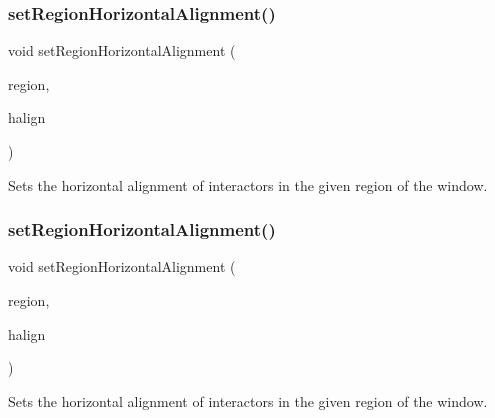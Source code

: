 \subsubsection{\texorpdfstring{set\+Region\+Horizontal\+Alignment()}{setRegionHorizontalAlignment()}\hspace{0.1cm}{\footnotesize\ttfamily [1/2]}}
{\footnotesize\ttfamily void set\+Region\+Horizontal\+Alignment (\begin{DoxyParamCaption}\item[{\mbox{\hyperlink{classGWindow_a81a01a86de31071a92e6cce0bab9bc4b}{Region}}}]{region,  }\item[{Horizontal\+Alignment}]{halign }\end{DoxyParamCaption})\hspace{0.3cm}{\ttfamily [virtual]}}



Sets the horizontal alignment of interactors in the given region of the window. 

\mbox{\label{classGWindow_aefb97090ff4e149f8a0cce9efee3c451}} 
\subsubsection{\texorpdfstring{set\+Region\+Horizontal\+Alignment()}{setRegionHorizontalAlignment()}\hspace{0.1cm}{\footnotesize\ttfamily [2/2]}}
{\footnotesize\ttfamily void set\+Region\+Horizontal\+Alignment (\begin{DoxyParamCaption}\item[{const std\+::string \&}]{region,  }\item[{const std\+::string \&}]{halign }\end{DoxyParamCaption})\hspace{0.3cm}{\ttfamily [virtual]}}



Sets the horizontal alignment of interactors in the given region of the window. 

\mbox{\label{classGWindow_afbe22d897ce8ef25db52cbc3d456aa0a}} 
